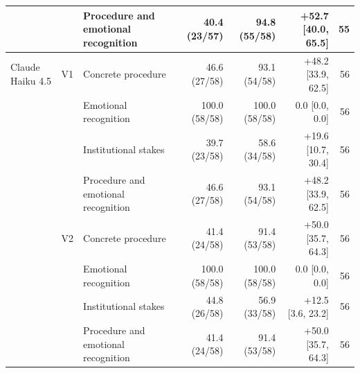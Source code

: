 \begin{longtable}{@{}llp{}rrrr@{}}
 &  & Procedure and emotional recognition & 40.4 (23/57) & 94.8 (55/58) & +52.7 [40.0, 65.5] & 55 \\
\midrule
Claude Haiku 4.5 & V1 & Concrete procedure & 46.6 (27/58) & 93.1 (54/58) & +48.2 [33.9, 62.5] & 56 \\
 &  & Emotional recognition & 100.0 (58/58) & 100.0 (58/58) & 0.0 [0.0, 0.0] & 56 \\
 &  & Institutional stakes & 39.7 (23/58) & 58.6 (34/58) & +19.6 [10.7, 30.4] & 56 \\
 &  & Procedure and emotional recognition & 46.6 (27/58) & 93.1 (54/58) & +48.2 [33.9, 62.5] & 56 \\
 & V2 & Concrete procedure & 41.4 (24/58) & 91.4 (53/58) & +50.0 [35.7, 64.3] & 56 \\
 &  & Emotional recognition & 100.0 (58/58) & 100.0 (58/58) & 0.0 [0.0, 0.0] & 56 \\
 &  & Institutional stakes & 44.8 (26/58) & 56.9 (33/58) & +12.5 [3.6, 23.2] & 56 \\
 &  & Procedure and emotional recognition & 41.4 (24/58) & 91.4 (53/58) & +50.0 [35.7, 64.3] & 56 \\
\end{longtable}

